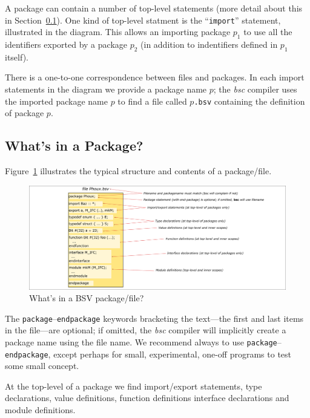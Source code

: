 A package can contain a number of top-level statements (more detail
about this in Section~\ref{Sec_package_contents}).  One kind of
top-level statment is the ``\verb|import|'' statement, illustrated in
the diagram.  This allows an importing package $p_1$ to use all the
identifiers exported by a package $p_2$ (in addition to indentifiers
defined in $p_1$ itself).

There is a one-to-one correspondence between files and packages.  In
each import statements in the diagram we provide a package name $p$;
the \emph{bsc} compiler uses the imported package name $p$ to find a
file called $p$\verb|.bsv| containing the definition of package $p$.


\subsection{What's in a Package?}

\label{Sec_package_contents}

Figure~\ref{Fig_BSV_Package} illustrates the typical
structure and contents of a package/file.
\begin{figure}[htbp]
  \centerline{\includegraphics[width=6in,angle=0]{Figures/Fig_BSV_Package}}
  \caption{\label{Fig_BSV_Package}
           What's in a BSV package/file?}
\end{figure}

The \verb|package|--\verb|endpackage| keywords bracketing the
text---the first and last items in the file---are optional; if
omitted, the \emph{bsc} compiler will implicitly create a package name
using the file name.  We recommend always to use
\verb|package|--\verb|endpackage|, except perhaps for small,
experimental, one-off programs to test some small concept.

At the top-level of a package we find import/export statements, type
declarations, value definitions, function definitions interface
declarations and module definitions.

